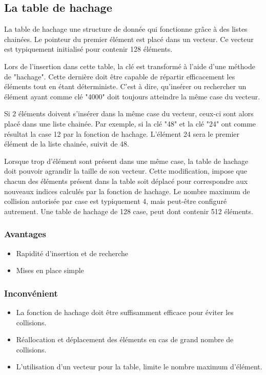 \documentclass[hidelinks,a4paper, 12pt]{article}
\begin{document}
	\subsection{La table de hachage}
	La table de hachage une structure de donnée qui fonctionne grâce à des listes chainées. Le pointeur du premier élément est placé dans un vecteur. Ce vecteur est typiquement initialisé pour contenir 128 éléments. 
	
	Lors de l'insertion dans cette table, la clé est transformé à l'aide d'une méthode de "hachage". Cette dernière doit être capable de répartir efficacement les éléments tout en étant déterministe. C'est à dire, qu'insérer ou rechercher un élément ayant comme clé "4000" doit toujours atteindre la même case du vecteur. 
	
	Si 2 éléments doivent s'insérer dans la même case du vecteur, ceux-ci sont alors placé dans une liste chainée. Par exemple, si la clé "48" et la clé "24" ont comme résultat la case 12 par la fonction de hachage. L'élément 24 sera le premier élément de la liste chainée, suivit de 48.
	
	Lorsque trop d'élément sont présent dans une même case, la table de hachage doit pouvoir agrandir la taille de son vecteur. Cette modification, impose que chacun des éléments présent dans la table soit déplacé pour correspondre aux nouveaux indices calculés par la fonction de hachage. Le nombre maximum de collision autorisée par case est typiquement 4, mais peut-être configuré autrement. Une table de hachage de 128 case, peut dont contenir 512 éléments. 
	
	
	
	
	\subsubsection*{Avantages}
	\begin{itemize}
		\item Rapidité d'insertion et de recherche
		\item Mises en place simple
	\end{itemize}
	\subsubsection*{Inconvénient}
	\begin{itemize}
		\item La fonction de hachage doit être suffisamment efficace pour éviter les collisions.
		\item Réallocation et déplacement des éléments en cas de grand nombre de collisions.
		\item L'utilisation d'un vecteur pour la table, limite le nombre maximum d'élément.
	\end{itemize}
\end{document}
